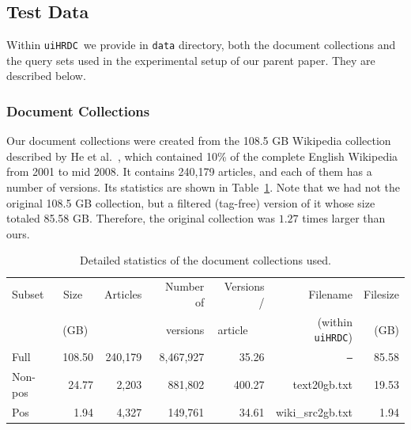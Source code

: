 \documentclass[review]{elsarticle}
\newcommand{\uilib}{{\tt uiHRDC}}
\begin{document}
\subsection{Test Data} \label{sec:testdata}
Within \uilib\ we provide in \texttt{data} directory, both the document collections and the query sets used in the experimental setup of our parent paper.
They are described below.

\subsubsection{Document Collections}

Our document collections were created from the 108.5 GB Wikipedia collection described by He et al.~\cite{HZS10}, which contained 10\% of 
the complete English Wikipedia from 2001 to mid 2008. It contains 240,179 articles, and each of them has a number of versions. Its statistics
are shown in Table~\ref{tab:coll}. Note that we had not the original 108.5 GB collection, but a filtered (tag-free) version of it whose size
totaled 85.58 GB. Therefore, the original collection was $1.27$ times larger than ours.

\begin{table}[htb]
	{\small
		\begin{center}
			\begin{tabular}{|l|r|r|r|r||r|r|}
				\hline                                                                                           
				Subset   & Size~~ & Articles & Number of & Versions / &       {Filename}         &        {Filesize}  \\
				         & (GB)~  &          & versions  & article~~~ &     (within \uilib)      &        {(GB)}      \\
				\hline                                                                                           
				\hline                                                                                           
				Full     & 108.50 &  240,179 & 8,467,927 &      35.26 &        {\tt --}          &            {85.58} \\
				Non-pos  &  24.77 &    2,203 &   881,802 &     400.27 &        {text20gb.txt}    &            {19.53} \\
				Pos      &   1.94 &    4,327 &   149,761 &      34.61 &       { wiki\_src2gb.txt}&             {1.94} \\
				\hline                                                                                           
				
			\end{tabular}
		\end{center}
	}
	\caption{Detailed statistics of the document collections used.} 
	\label{tab:coll}
\end{table}
\end{document}
